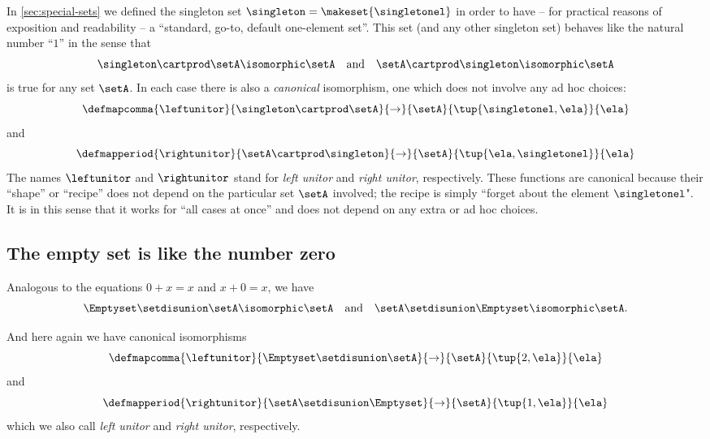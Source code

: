 In \cref{sec:special-sets} we defined the singleton set $\singleton = \makeset{\singletonel}$ in order to have -- for practical reasons of exposition and readability -- a ``standard, go-to, default one-element set''.
This set (and any other singleton set) behaves like the natural number ``$1$'' in the sense that
\begin{equation}\label{eq:singleton-set-is-neutral-for-prod}
    \singleton \cartprod \setA \isomorphic \setA \quad \text{and} \quad \setA \cartprod \singleton \isomorphic \setA
\end{equation}
is true for any set $\setA$. In each case there is also a \emph{canonical} isomorphism, one which does not involve any ad hoc choices:
\begin{equation}\label{eq:leftunitor-sets-prod}
    \defmapcomma{
        \leftunitor
    }{
        \singleton \cartprod \setA
    }{
        \to
    }{
        \setA
    }{
        \tup{\singletonel, \ela}
    }{
        \ela
    }
\end{equation}
and
\begin{equation}\label{eq:rightunitor-sets-prod}
    \defmapperiod{
        \rightunitor
    }{
        \setA \cartprod \singleton
    }{
        \to
    }{
        \setA
    }{
        \tup{\ela, \singletonel}
    }{
        \ela
    }
\end{equation}
The names $\leftunitor$ and $\rightunitor$ stand for \emph{left unitor} and \emph{right unitor}, respectively.
These functions are canonical because their ``shape'' or ``recipe'' does not depend on the particular set $\setA$ involved; the recipe is simply ``forget about the element $\singletonel$".
It is in this sense that it works for ``all cases at once'' and does not depend on any extra or ad hoc choices.

\subsection{The empty set is like the number zero}

Analogous to the equations $0 + x = x$ and $x + 0 = x$, we have
\begin{equation}\label{eq:singleton-set-is-neutral-for-sum}
    \Emptyset \setdisunion \setA \isomorphic \setA \quad \text{and} \quad \setA \setdisunion \Emptyset \isomorphic \setA.
\end{equation}

And here again we have canonical isomorphisms
\begin{equation}\label{eq:leftunitor-sets-sum}
    \defmapcomma{
        \leftunitor
    }{
        \Emptyset \setdisunion \setA
    }{
        \to
    }{
        \setA
    }{
        \tup{2, \ela}
    }{
        \ela
    }
\end{equation}
and
\begin{equation}\label{eq:rightunitor-sets-sum}
    \defmapperiod{
        \rightunitor
    }{
        \setA \setdisunion \Emptyset
    }{
        \to
    }{
        \setA
    }{
        \tup{1, \ela}
    }{
        \ela
    }
\end{equation}
which we also call \emph{left unitor} and \emph{right unitor}, respectively.

